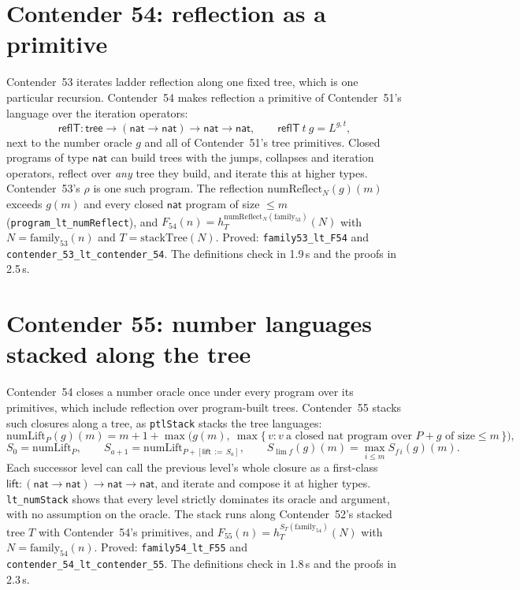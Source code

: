 \documentclass[11pt]{article}
\theoremstyle{definition}
\theoremstyle{remark}
\newcommand{\lean}[1]{\texttt{#1}}
\begin{document}
\section{Contender 54: reflection as a primitive}

Contender~53 iterates ladder reflection along one fixed tree, which is one
particular recursion. Contender~54 makes reflection a primitive of Contender~51's
language over the iteration operators:
\[
\mathsf{reflT}:\mathsf{tree}\to(\mathsf{nat}\to\mathsf{nat})\to\mathsf{nat}\to\mathsf{nat},\qquad
\mathsf{reflT}\ t\ g=L^{g,t},
\]
next to the number oracle $g$ and all of Contender~51's tree primitives. Closed
programs of type $\mathsf{nat}$ can build trees with the jumps, collapses and
iteration operators, reflect over \emph{any} tree they build, and iterate this
at higher types. Contender~53's $\rho$ is one such program. The reflection
$\mathrm{numReflect}_N(g)(m)$ exceeds $g(m)$ and every closed $\mathsf{nat}$
program of size $\le m$ (\lean{program\_lt\_numReflect}), and
$F_{54}(n)=h^{\mathrm{numReflect}_N(\mathrm{family}_{53})}_T(N)$ with
$N=\mathrm{family}_{53}(n)$ and $T=\mathrm{stackTree}(N)$. Proved:
\lean{family53\_lt\_F54} and \lean{contender\_53\_lt\_\allowbreak contender\_54}.
The definitions check in 1.9\,s and the proofs in 2.5\,s.

\section{Contender 55: number languages stacked along the tree}

Contender~54 closes a number oracle once under every program over its
primitives, which include reflection over program-built trees. Contender~55
stacks such closures along a tree, as \lean{ptlStack} stacks the tree languages:
\[
\mathrm{numLift}_{P}(g)(m)=m+1+\max\bigl(g(m),\ \max\{\,v : v\ \text{a closed nat program over }P+g\text{ of size}\le m\,\}\bigr),
\]
\[
S_0=\mathrm{numLift}_P,\qquad S_{a+1}=\mathrm{numLift}_{P+[\mathsf{lift}\,:=\,S_a]},\qquad
S_{\lim f}(g)(m)=\max_{i\le m}S_{f\,i}(g)(m).
\]
Each successor level can call the previous level's whole closure as a
first-class $\mathsf{lift}:(\mathsf{nat}\to\mathsf{nat})\to\mathsf{nat}\to\mathsf{nat}$,
and iterate and compose it at higher types. \lean{lt\_numStack} shows that
every level strictly dominates its oracle and argument, with no assumption on
the oracle. The stack runs along Contender~52's stacked tree $T$ with
Contender~54's primitives, and $F_{55}(n)=h^{S_T(\mathrm{family}_{54})}_T(N)$ with
$N=\mathrm{family}_{54}(n)$. Proved: \lean{family54\_lt\_F55} and
\lean{contender\_54\_lt\_\allowbreak contender\_55}. The definitions check in
1.8\,s and the proofs in 2.3\,s.
\end{document}
